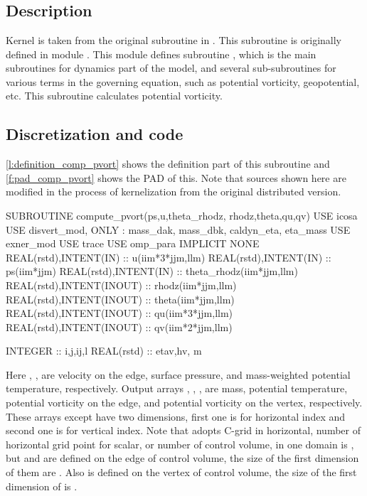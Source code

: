 \section{}

\subsection{Description}

Kernel  is taken from the original subroutine
 in \DYNAMICO.
%
This subroutine is originally defined in module .
%
This module defines subroutine , which is the main
subroutines for dynamics part of the model, and several sub-subroutines
for various terms in the governing equation, such as potential
vorticity, geopotential, etc.
%
This subroutine calculates potential vorticity.


\subsection{Discretization and code}

\autoref{l:definition_comp_pvort} shows the definition part of this subroutine
and \autoref{f:pad_comp_pvort} shows the PAD of
this.
%
Note that sources shown here are modified in the process of
kernelization from the original distributed version.

\begin{LstF90}[%
caption={Definition part of \src{compute_pvort}},%
label={l:definition_comp_pvort}%
]
SUBROUTINE compute_pvort(ps,u,theta_rhodz, rhodz,theta,qu,qv)
  USE icosa
  USE disvert_mod, ONLY : mass_dak, mass_dbk, caldyn_eta, eta_mass
  USE exner_mod
  USE trace
  USE omp_para
  IMPLICIT NONE
  REAL(rstd),INTENT(IN)  :: u(iim*3*jjm,llm)
  REAL(rstd),INTENT(IN)  :: ps(iim*jjm)
  REAL(rstd),INTENT(IN)  :: theta_rhodz(iim*jjm,llm)
  REAL(rstd),INTENT(INOUT) :: rhodz(iim*jjm,llm)
  REAL(rstd),INTENT(INOUT) :: theta(iim*jjm,llm)
  REAL(rstd),INTENT(INOUT) :: qu(iim*3*jjm,llm)
  REAL(rstd),INTENT(INOUT) :: qv(iim*2*jjm,llm)

  INTEGER :: i,j,ij,l
  REAL(rstd) :: etav,hv, m
\end{LstF90}
%
Here , ,  are velocity on the edge, surface pressure,
and mass-weighted potential temperature, respectively.
Output arrays , , ,  are mass, potential temperature,
potential vorticity on the edge, and potential vorticity on the vertex, respectively.
%
These arrays except  have two dimensions, first one is for
horizontal index and second one is for vertical index.
%
Note that \DYNAMICO adopts C-grid in horizontal, number of horizontal
grid point for scalar, or number of control volume, in one domain is
, but  and  are defined on the edge of
control volume, the size of the first dimension of them are
.  Also  is defined on the vertex of control
volume, the size of the first dimension of  is .

